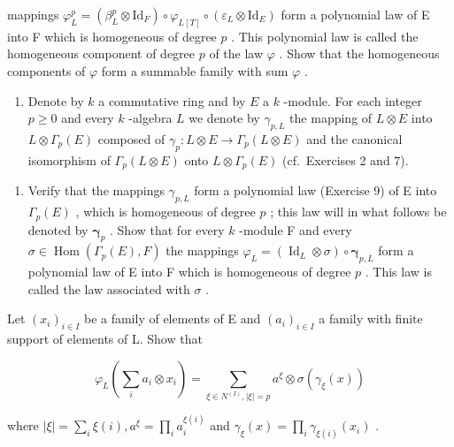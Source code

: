 mappings \(\varphi_{L}^{p} = (\beta_{L}^{p}\otimes \mathrm{Id}_{F})\circ \varphi_{L[T]}\circ (\varepsilon_{L}\otimes \mathrm{Id}_{E})\) form a polynomial law of E into F which is homogeneous of degree \(p\) . This polynomial law is called the homogeneous component of degree \(p\) of the law \(\varphi\) . Show that the homogeneous components of \(\varphi\) form a summable family with sum \(\varphi\) .

\begin{enumerate}
\def\labelenumi{\arabic{enumi})}
\setcounter{enumi}{9}
\tightlist
\item
  Denote by \(k\) a commutative ring and by \(E\) a \(k\) -module. For each integer \(p \geqslant 0\) and every \(k\) -algebra \(L\) we denote by \(\gamma_{p,L}\) the mapping of \(L \otimes E\) into \(L \otimes \Gamma_p(E)\) composed of \(\gamma_p: L \otimes E \to \Gamma_p(L \otimes E)\) and the canonical isomorphism of \(\Gamma_p(L \otimes E)\) onto \(L \otimes \Gamma_p(E)\) (cf.~Exercises 2 and 7).
\end{enumerate}

\begin{enumerate}
\def\labelenumi{\alph{enumi})}
\tightlist
\item
  Verify that the mappings \(\gamma_{p,L}\) form a polynomial law (Exercise 9) of E into \(\Gamma_p(E)\) , which is homogeneous of degree \(p\) ; this law will in what follows be denoted by \(\boldsymbol{\gamma}_p\) . Show that for every \(k\) -module F and every \(\sigma \in \operatorname{Hom}(\Gamma_p(E), F)\) the mappings \(\varphi_L = (\operatorname{Id}_L \otimes \sigma) \circ \boldsymbol{\gamma}_{p,L}\) form a polynomial law of E into F which is homogeneous of degree \(p\) . This law is called the law associated with \(\sigma\) .
\end{enumerate}

Let \((x_{i})_{i\in I}\) be a family of elements of E and \((a_{i})_{i\in I}\) a family with finite support of elements of L. Show that

\[
\varphi_ {L} \left(\sum_ {i} a _ {i} \otimes x _ {i}\right) = \sum_ {\xi \in N ^ {(I)}, | \xi | = p} a ^ {\xi} \otimes \sigma (\gamma_ {\xi} (x))
\]

where \(|\xi| = \sum_{i} \xi(i), a^{\xi} = \prod_{i} a_{i}^{\xi(i)}\) and \(\gamma_{\xi}(x) = \prod_{i} \gamma_{\xi(i)}(x_{i})\) .

